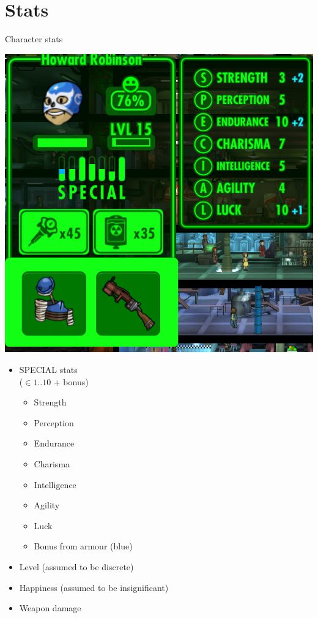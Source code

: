 \documentclass{beamer}
\begin{document}
\section{Stats}
\begin{frame}{Character stats}
  \begin{minipage}{.45\textwidth}
  \includegraphics[width=\textwidth]{stats}
  \end{minipage}
  \hfill
  \begin{minipage}{.45\textwidth}
  \begin{itemize}
  \item SPECIAL stats\\($\in 1..10$ + bonus)
  \begin{itemize}
  \item Strength
  \item Perception 
  \item Endurance 
  \item Charisma 
  \item Intelligence 
  \item Agility 
  \item Luck
  \item Bonus from armour (blue)
  \end{itemize}
  \item Level (assumed to be discrete)
  \item Happiness (assumed to be insignificant)
  \item Weapon damage
  
  

  \end{itemize}
  \end{minipage}
  

  
\end{frame}
\end{document}
